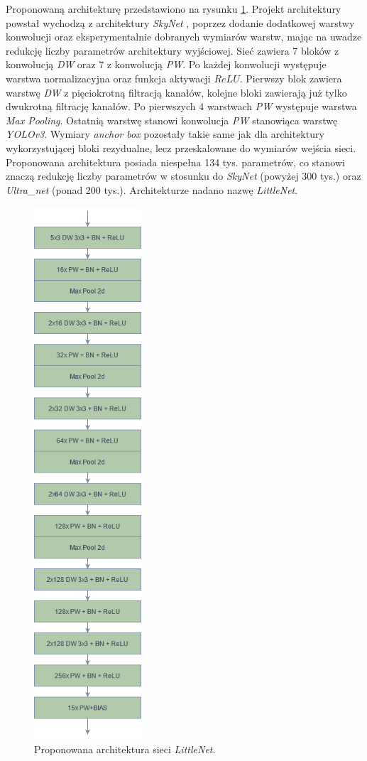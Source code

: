 Proponowaną architekturę przedstawiono na rysunku \ref{fig:LN_arch}. 
Projekt architektury powstał wychodzą z architektury \emph{SkyNet} \cite{skynet}, 
poprzez dodanie dodatkowej warstwy konwolucji oraz eksperymentalnie dobranych wymiarów warstw, mając na uwadze redukcję liczby parametrów architektury wyjściowej. 
Sieć zawiera 7 bloków z konwolucją \emph{DW} oraz 7 z konwolucją \emph{PW}. 
Po każdej konwolucji występuje warstwa normalizacyjna oraz funkcja aktywacji $ReLU$. 
Pierwszy blok zawiera warstwę \emph{DW} z pięciokrotną filtracją kanałów, kolejne bloki zawierają już tylko dwukrotną filtrację kanałów.
Po pierwszych 4 warstwach \emph{PW} występuje warstwa \emph{Max Pooling}. 
Ostatnią warstwę stanowi konwolucja \emph{PW} stanowiąca warstwę \emph{YOLOv3}. 
Wymiary \emph{anchor box} pozostały takie same jak dla architektury wykorzystującej bloki rezydualne, lecz przeskalowane do wymiarów wejścia sieci. 
Proponowana architektura posiada niespełna 134 tys. parametrów, co stanowi znaczą redukcję liczby parametrów w stosunku do \emph{SkyNet} (powyżej 300 tys.) oraz \emph{Ultra\_net} (ponad 200 tys.). 
Architekturze nadano %
nazwę \emph{LittleNet}.
\begin{figure}
    \centering
    \includegraphics[width=4cm]{images/LNv1}
    \caption{Proponowana architektura sieci \emph{LittleNet}.}
    \label{fig:LN_arch}
\end{figure}

